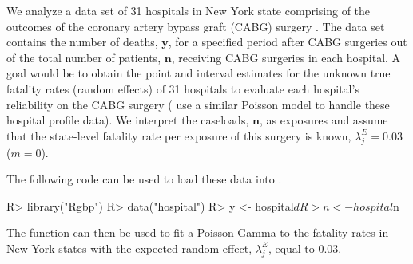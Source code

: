 \documentclass[article]{jss}
\begin{document}

We analyze a data set of 31 hospitals in New York state comprising of the outcomes of the coronary artery bypass graft (CABG) surgery \citep{morris2012}. The data set contains the number of deaths, $\boldsymbol{y}$, for a specified period after CABG surgeries out of the total number of patients, $\boldsymbol{n}$, receiving CABG surgeries in each hospital. A goal would be to obtain the point and interval estimates for the unknown true fatality rates (random effects) of 31 hospitals to evaluate  each hospital's reliability on the CABG surgery (\cite{morris1995} use a similar Poisson model to handle these hospital profile data). We interpret the caseloads, $\boldsymbol{n}$,  as exposures and assume that the state-level fatality rate per exposure of this surgery  is known, $\lambda^E_j= 0.03$ ($m=0$). 


The following code can be used to load these data into .
\begin{CodeChunk}
\begin{CodeInput}
R> library("Rgbp")
R> data("hospital")
R> y <- hospital$d
R> n <- hospital$n
\end{CodeInput}
\end{CodeChunk}






The function  can then be used to fit a Poisson-Gamma to the fatality
rates in New York states with the expected random effect, $\lambda^E_j$, equal to 0.03.
\end{document}

